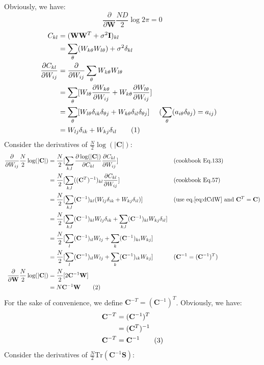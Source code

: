 \documentclass[12pt]{article}
\newenvironment{question}[2][Question]{\begin{trivlist}
\kern10pt
\item[\hskip \labelsep {\bfseries #1}\hskip \labelsep {\bfseries #2.}]}{\end{trivlist}}
\newcommand\numberthis{\addtocounter{equation}{1}\tag{\theequation}}
\begin{document}
\begin{question}{15}
Obviously, we have:
\begin{equation}
  \frac{\partial}{\partial \mathbf{W}}\frac{ND}{2}\log{2\pi} = 0
  \label{eq:Q15-dL0}
\end{equation}
\begin{align*}
  C_{kl} &= (\mathbf{W}\mathbf{W}^T + \sigma^2\mathbf{I})_{kl} \\
  &= \sum_{\theta}(W_{k\theta}W_{l\theta}) + \sigma^2\delta_{kl} \\
  \frac{\partial C_{kl}}{\partial W_{ij}} 
  &= \frac{\partial}{\partial W_{ij}}\sum_{\theta}W_{k\theta}W_{l\theta} \\
  &= \sum_{\theta}[W_{l\theta}\frac{\partial W_{k\theta}}{\partial W_{ij}} 
                 + W_{k\theta}\frac{\partial W_{l\theta}}{\partial W_{ij}}] \\
  &= \sum_{\theta}[W_{l\theta}\delta_{ik}\delta_{\theta j} + W_{k\theta}\delta_{il}\delta_{\theta j}]
    &&(\sum_{\theta}(a_{i\theta}\delta_{\theta j}) = a_{ij}) \\
  &= W_{lj}\delta_{ik} + W_{kj}\delta_{il} \numberthis \label{eq:dCdW}
\end{align*}
Consider the derivatives of $\frac{N}{2}\log(|\mathbf{C}|)$:
\begin{align*}
  \frac{\partial}{\partial W_{ij}}\frac{N}{2}\log(|\mathbf{C}|)
  &= \frac{N}{2}[\sum_{k,l} \frac{\partial \log(|\mathbf{C}|)}{\partial C_{kl}}
                           \frac{\partial C_{kl}}{\partial W_{ij}} ]
      && (\text{cookbook Eq.133}) \\
  &= \frac{N}{2}[\sum_{k,l} ((\mathbf{C}^T)^{-1})_{kl}
                            \frac{\partial C_{kl}}{\partial W_{ij}} ]
      && (\text{cookbook Eq.57}) \\
  &= \frac{N}{2}[\sum_{k,l} (\mathbf{C}^{-1})_{kl}
                 (W_{lj}\delta_{ik} + W_{kj}\delta_{il})]
      && (\text{use eq.\eqref{eq:dCdW} and } \mathbf{C}^T = \mathbf{C}) \\
  &= \frac{N}{2}[\sum_{k,l} (\mathbf{C}^{-1})_{kl}W_{lj}\delta_{ik}
        + \sum_{k,l} (\mathbf{C}^{-1})_{kl}W_{kj}\delta_{il}] \\
  &= \frac{N}{2}[\sum_{l} (\mathbf{C}^{-1})_{il}W_{lj}
        + \sum_{k} (\mathbf{C}^{-1})_{ki}W_{kj}] \\
  &= \frac{N}{2}[\sum_{l} (\mathbf{C}^{-1})_{il}W_{lj}
        + \sum_{k} (\mathbf{C}^{-1})_{ik}W_{kj}]
      && (\mathbf{C}^{-1} = (\mathbf{C}^{-1})^T) \\
  \frac{\partial}{\partial \mathbf{W}}\frac{N}{2}\log(|\mathbf{C}|)
  &= \frac{N}{2}[2\mathbf{C}^{-1}\mathbf{W}] \\
  &= N\mathbf{C}^{-1}\mathbf{W} \numberthis \label{eq:Q15-dL1}
\end{align*}
For the sake of convenience, we define $\mathbf{C}^{-T} = (\mathbf{C}^{-1})^T$.
Obviously, we have:
\begin{align*}
  \mathbf{C}^{-T} &= (\mathbf{C}^{-1})^T \\
                  &= (\mathbf{C}^{T})^{-1} \\
  \mathbf{C}^{-T} &= \mathbf{C}^{-1} \numberthis \label{eq:C^-T}
\end{align*}
Consider the derivatives of $\frac{N}{2}\text{Tr}(\mathbf{C}^{-1}\mathbf{S})$:


\end{question}
\end{document}
